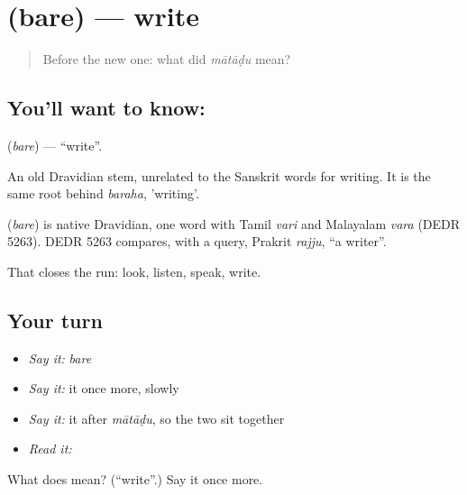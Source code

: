 \section[\texorpdfstring{\kn{ಬರೆ} (bare)}{ಬರೆ (bare)}]{ (bare) — write}

\label{lesson:KA-C44-write}



\begin{quote}
Before the new one: what did \emph{mātāḍu} mean?
\end{quote}

\subsection*{You'll want to know: }
\textbf{} (\emph{bare}) — \textquotedblleft{}write\textquotedblright{}.

An old Dravidian stem, unrelated to the Sanskrit words for writing. It is the same root behind \emph{baraha}, 'writing'.

\begin{cousinweb}
\textbf{} (\emph{bare}) is native Dravidian, one word with Tamil \emph{vari} and Malayalam \emph{vara} (DEDR 5263). DEDR 5263 compares, with a query, Prakrit \emph{rajju}, \textquotedblleft{}a writer\textquotedblright{}.
\end{cousinweb}

\begin{grammarlens}[title={What you've built}]
That closes the run: look, listen, speak, write.
\end{grammarlens}

\subsection*{Your turn}
\begin{itemize}
\raggedright
  \item \emph{Say it:} \emph{bare}
  \item \emph{Say it:} it once more, slowly
  \item \emph{Say it:} it after \emph{mātāḍu}, so the two sit together
  \item \emph{Read it:} \textbf{}
\end{itemize}

\begin{tcolorbox}[breakable,colback=teal!4,colframe=teal!35!black,title={Before you move on}]
What does  mean? (\textquotedblleft{}write\textquotedblright{}.) Say it once more.
\end{tcolorbox}
